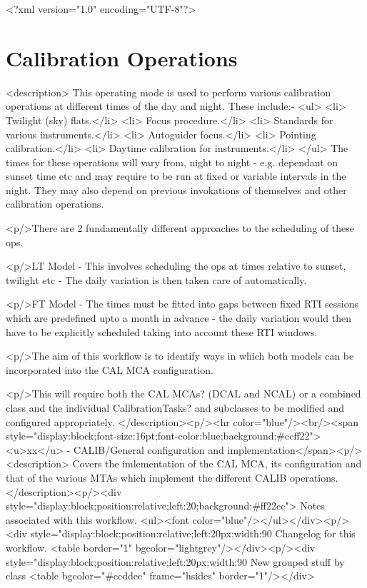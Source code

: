 <?xml version="1.0" encoding="UTF-8"?>


     

    \section{Calibration Operations}

    <description>
      This operating mode is used to perform various calibration operations at different times
      of the day and night. These include:-
      <ul>
	<li> Twilight (sky) flats.</li>
	<li> Focus procedure.</li>
	<li> Standards for various instruments.</li>
	<li> Autoguider focus.</li>
	<li> Pointing calibration.</li>
	<li> Daytime calibration for instruments.</li>
      </ul>
      The times for these operations will vary from, night to night - e.g. dependant on sunset time etc 
      and may require to be run at fixed or variable intervals in the night. 
      They may also depend on previous invokations of themselves and other calibration operations.
      
      <p/>There are 2 fundamentally different approaches to the scheduling of these ops.
	
	<p/>LT Model - This involves scheduling the ops at times relative to sunset, twilight etc - 
	  The daily variation is then taken care of automatically.
	  
	  <p/>FT Model - The times must be fitted into gaps between fixed RTI sessions which are predefined 
	    upto a month in advance - the daily variation would then have to be explicitly scheduled taking 
	    into account these RTI windows.
	    
	    <p/>The aim of this workflow is to identify ways in which both models can be incorporated into 
	      the CAL MCA configuration.
	      
	      <p/>This will require both the CAL MCAs? (DCAL and NCAL) or a combined class and the 
		individual CalibrationTasks? and subclasses to be modified and configured appropriately.
    </description><p/><hr color="blue"/><br/><span style="display:block;font-size:16pt;font-color:blue;background:#ccff22"><u>xx</u> -    CALIB/General configuration and implementation</span><p/><description>
	Covers the imlementation of the CAL MCA, its configuration and that of the various MTAs which
	implement the different CALIB operations.
      </description><p/><div style="display:block;position:relative;left:20;background:#ff22cc">
      Notes associated with this workflow.
      <ul><font color="blue"/></ul></div><p/><div style="display:block;position:relative;left:20px;width:90%
      Changelog for this workflow.
      <table border="1" bgcolor="lightgrey"/></div><p/><div style="display:block;position:relative;left:20px;width:90%
     New grouped stuff by class
     <table bgcolor="#ccddee" frame="hsides" border="1"/></div>

